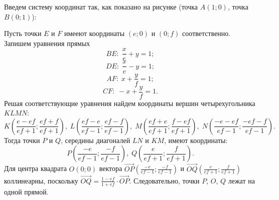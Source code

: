 \solutionSection
Введем систему координат так, как показано на рисунке (точка $A(1;0)$, точка $B(0;1)$): 

Пусть точки $E$  и $F$ имееют координаты $(e;0)$ и $(0;f)$ соответственно. Запишем уравнения прямых
$$BE:\; \dfrac{x}{e}+y=1;$$ 
$$DE:\; \dfrac{x}{e}-y=1;$$ 
$$AF:\;  x+\dfrac{y}{f}=1;$$ 
$$CF:\;  -x+\dfrac{y}{f}=1.$$
Решая соответствующие уравнения найдем координаты вершин четырехугольника $KLMN$: $$K\left(\frac{e-ef}{ef+1};\frac{ef+f}{ef+1}\right),\; L\left(\frac{ef-e}{ef-1};\frac{ef-f}{ef-1}\right),\; M\left(\frac{ef+e}{ef+1};\frac{f-ef}{ef+1}\right),\;N\left(\frac{-e-ef}{ef-1};\frac{-ef-f}{ef-1}\right).$$
Тогда точки $P$ и $Q$, середины диагоналей $LN$ и $KM$,  имеют координаты: $$P\left(\frac{-e}{ef-1};\frac{-f}{ef-1}\right),\; Q\left(\frac{e}{ef+1};\frac{f}{ef+1}\right).$$ 
Для центра квадрата $O(0;0)$ вектора $\overrightarrow{OP}\left(\frac{-e}{ef-1};\frac{-f}{ef-1}\right)$ и $ \overrightarrow{OQ}\left(\frac{e}{ef+1};\frac{f}{ef+1}\right)$ коллинеарны, поскольку $\overrightarrow{OQ}=\frac{1-ef}{1+ef}\cdot\overrightarrow{OP}$. Следовательно, точки $P$, $O$, $Q$ лежат на одной прямой.
